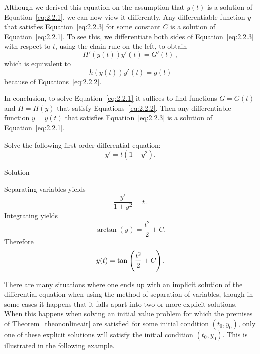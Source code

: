 Although we derived this equation on the assumption that $y(t)$ is a solution of Equation~\eqref{eq:2.2.1}, we can now view it differently. Any differentiable function $y$ that satisfies Equation~\eqref{eq:2.2.3} for some constant $C$ is a solution of Equation~\eqref{eq:2.2.1}. To see this, we differentiate both sides of Equation~\eqref{eq:2.2.3} with respect to $t$, using the chain rule on the left, to obtain
$$
H'(y(t))y'(t)=G'(t)\,,
$$
which is equivalent to
$$
h(y(t))y'(t)=g(t)
$$
because of Equations~\eqref{eq:2.2.2}.

In conclusion, to solve Equation~\eqref{eq:2.2.1} it suffices to find functions $G=G(t)$ and $H=H(y)$ that satisfy Equations~\eqref{eq:2.2.2}. Then any differentiable function  $y=y(t)$  that satisfies Equation~\eqref{eq:2.2.3} is a solution of Equation~\eqref{eq:2.2.1}.


\begin{example}\label{example:2.2.1}
Solve the following first-order differential equation:
$$
y'=t\left(1+y^2\right).
$$

Solution 


Separating variables yields
$$
\dfrac{y'}{1+y^2}=t\,.
$$
Integrating yields
$$
\arctan (y)=\dfrac{t^2}{2}+C.
$$
Therefore
$$
y(t)=\tan\left({t^2\over2}+C\right).
$$
\vspace*{-0.5cm}
\end{example}

There are many situations where one ends up with an implicit solution of the differential equation when using the method of separation of variables, though in some cases it happens that it falls apart into two or more explicit solutions. When this happens when solving an initial value problem for which the premises of Theorem~\ref{theononlineair} are satisfied for some initial condition $(t_0,y_0)$, only one of these explicit solutions will satisfy the initial condition $(t_0,y_0)$. This is illustrated in the following example.


